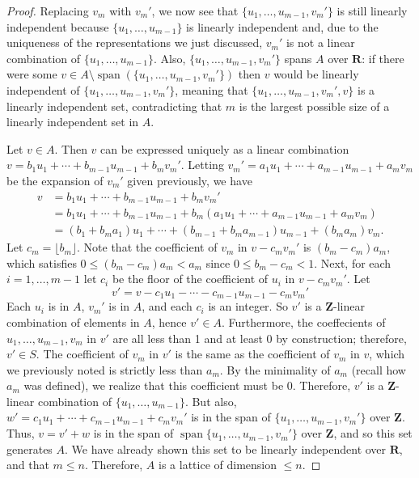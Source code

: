 \documentclass[10pt]{article}
\newcommand{\Z}{\mathbf{Z}}
\newcommand{\R}{\mathbf{R}}
\DeclareMathOperator*{\spn}{span}
\begin{document}
\begin{proof}
Replacing $v_m$ with $v_m'$, we now see that $\{u_1, \dots , u_{m-1}, v_m'\}$ is still linearly independent because $\{u_1, \dots , u_{m-1}\}$ is linearly independent and, due to the uniqueness of the representations we just discussed, $v_m'$ is not a linear combination of $\{u_1, \dots , u_{m-1}\}$.  Also, $\{u_1, \dots , u_{m-1}, v_m'\}$ spans $A$ over $\R$: if there were some $v \in A \setminus \spn (\{u_1, \dots , u_{m-1}, v_m'\})$ then $v$ would be linearly independent of $\{u_1, \dots , u_{m-1}, v_m'\}$, meaning that $\{u_1, \dots , u_{m-1} , v_m', v\}$ is a linearly independent set, contradicting that $m$ is the largest possible size of a linearly independent set in $A$.

Let $v \in A$.  Then $v$ can be expressed uniquely as a linear combination $v = b_1u_1 + \cdots + b_{m-1}u_{m-1} + b_mv_m'$.  Letting $v_m' = a_1u_1 + \cdots + a_{m-1}u_{m-1} + a_mv_m$ be the expansion of $v_m'$ given previously, we have
\begin{align*}
v &= b_1u_1 + \cdots + b_{m-1}u_{m-1} + b_mv_m' \\
&= b_1u_1 + \cdots + b_{m-1}u_{m-1} + b_m(a_1u_1 + \cdots + a_{m-1}u_{m-1} + a_mv_m) \\
&= (b_1 + b_ma_1)u_1 + \cdots + (b_{m-1} + b_ma_{m-1})u_{m-1} + (b_ma_m)v_m.
\end{align*}
Let $c_m = \lfloor b_m \rfloor$.  Note that the coefficient of $v_m$ in $v - c_m v_m'$ is $(b_m - c_m)a_m$, which satisfies $0 \leq (b_m - c_m)a_m < a_m$ since $0 \leq b_m - c_m < 1$.  Next, for each $i = 1, \dots , m-1$ let $c_i$ be the floor of the coefficient of $u_i$ in $v - c_m v_m'$.  Let
$$
v' = v - c_1u_1 - \cdots - c_{m-1}u_{m-1} - c_mv_m'
$$
Each $u_i$ is in $A$, $v_m'$ is in $A$, and each $c_i$ is an integer.  So $v'$ is a $\Z$-linear combination of elements in $A$, hence $v' \in A$.  Furthermore, the coeffecients of $u_1, \dots , u_{m-1}, v_m$ in $v'$ are all less than 1 and at least 0 by construction; therefore, $v' \in S$.  The coefficient of $v_m$ in $v'$ is the same as the coefficient of $v_m$ in $v$, which we previously noted is strictly less than $a_m$.  By the minimality of $a_m$ (recall how $a_m$ was defined), we realize that this coefficient must be $0$.  Therefore, $v'$ is a $\Z$-linear combination of $\{u_1, \dots , u_{m-1}\}$.  But also, $w' = c_1u_1 + \cdots + c_{m-1}u_{m-1} + c_m v_m'$ is in the span of $\{u_1, \dots , u_{m-1}, v_m'\}$ over $\Z$.  Thus, $v = v' + w$ is in the span of $ \spn\{u_1, \dots , u_{m-1}, v_m'\}$ over $\Z$, and so this set generates $A$.  We have already shown this set to be linearly independent over $\R$, and that $m \leq n$.  Therefore, $A$ is a lattice of dimension $\leq n$.
\end{proof}
\end{document}
